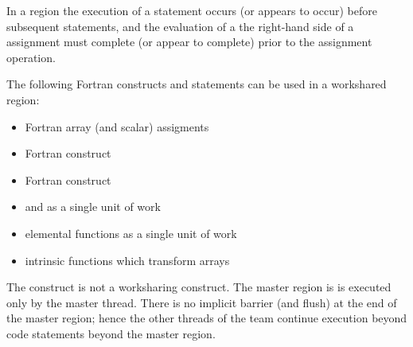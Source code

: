 In a  region the execution of a statement occurs 
(or appears to occur) before subsequent statements, and the evaluation 
of a the right-hand side of a assignment must complete 
(or appear to complete) prior to the assignment operation.

The following Fortran constructs and statements can be used in a workshared region:

\begin{itemize}

\item Fortran array (and scalar) assigments
\item Fortran  construct
\item Fortran  construct
\item {} and  as a single unit of work
\item elemental functions as a single unit of work
\item intrinsic functions which transform arrays

\end{itemize}

The  construct is not a worksharing construct.  The master region is
is executed only by the master thread. There is no implicit barrier (and flush) 
at the end of the master region; hence the other threads of the team continue
execution beyond code statements beyond the master region.

